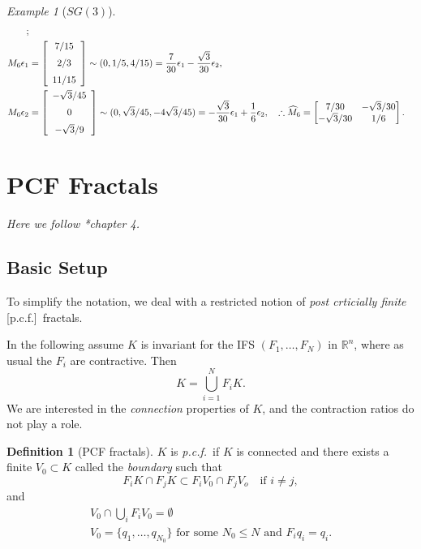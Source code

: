 \documentclass[a4paper]{amsart}
\theoremstyle{plain}
\theoremstyle{definition}
\newtheorem{definition}[theorem]{Definition}%
\theoremstyle{remark}
\newtheorem{example}[theorem]{Example}
\begin{document}
\begin{example}[$ SG(3) $]
\begin{align*}
;
\\
M_6 \epsilon_1  &=   \left[ \begin {array}{c} 7/15\\\noalign{\medskip}2/3
\\\noalign{\medskip}11/15 \end {array} \right] \sim (0, 1/5, 4/15) = \frac{7}{30}\epsilon_1-\frac{\sqrt{3}}{30}\epsilon_2
, 
\\
M_6 \epsilon_2  &=  \left[ \begin {array}{c} -\sqrt {3}/45\\\noalign{\medskip}0
\\\noalign{\medskip}-\sqrt {3}/9\end {array} \right] \sim (0, \sqrt{3}/45,-4\sqrt{3}/45)
= -\frac{\sqrt{3}}{30}\epsilon_1 +\frac{1}{6}\epsilon_2 ,
\quad 
\therefore \widehat{M}_6 = \begin{bmatrix} 7/30 & -\sqrt{3}/{30}\\ -\sqrt{3}/{30} & 1/6 \end{bmatrix} .
\end{align*} 
\end{example} 


\section{\textbf{PCF Fractals}} 

\emph{Here we follow \cite{Str}*{chapter 4}.}

\subsection{Basic Setup}

To simplify the notation, we deal with a restricted notion of \emph{post crticially finite} [p.c.f.]\ fractals.  

\bigskip In the following assume $ K $ is invariant for the IFS $ (F_1,\dots , F_N) $ in $ \mathbb{R}^n $, where as usual the $ F_i $ are contractive.  Then
\[  
K = \bigcup_{i=1}^N F_i K .
\]
 We are interested in the \emph{connection} properties of $ K $, and the contraction ratios do not play a role.
 
 \begin{definition}[PCF fractals]
 $ K $ is \emph{p.c.f.}\  if $ K $ is connected and there exists a finite $ V_0 \subset K $ called the \emph{boundary} 
such that 
\begin{equation} \label{jucpt} 
F_i K \cap F_j K \subset F_i V_0 \cap F_j V_o \quad \text{if } i \neq j,
\end{equation} 
and 
\begin{gather*} 
V_0 \cap \bigcup_i F_i V_0  = \emptyset \\
V_0 = \{ q_1,\dots , q_{N_0} \} \text{ for some } N_0 \leq N \text{ and } F_i q_i = q_ i .
\end{gather*}
\end{definition}
\end{document}
